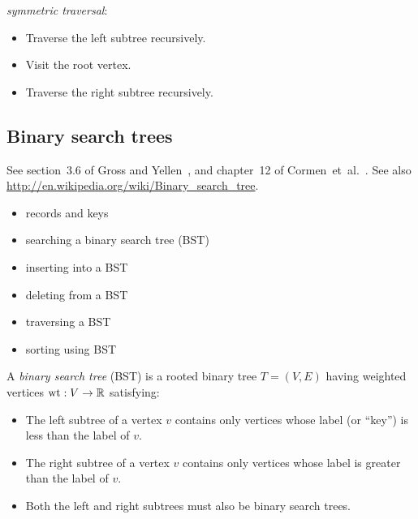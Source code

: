 \noindent
{\it symmetric traversal}:
\begin{itemize}
\item
Traverse the left subtree recursively.

\item
Visit the root vertex.

\item
Traverse the right subtree recursively.

\end{itemize}



\subsection{Binary search trees}

See section~3.6 of Gross and Yellen~\cite{GrossYellen1999}, and
chapter~12 of Cormen~et~al.~\cite{CormenEtAl2001}. See also
\url{http://en.wikipedia.org/wiki/Binary_search_tree}.


\begin{itemize}
\item records and keys

\item searching a binary search tree (BST)

\item inserting into a BST

\item deleting from a BST

\item traversing a BST

\item sorting using BST
\end{itemize}

A {\it binary search tree} (BST) is a rooted binary tree
$T=(V,E)$ having weighted vertices ${\rm wt}:V\to {\mathbb{R}}$ satisfying:

\begin{itemize}
\item
 The left subtree of a vertex $v$ contains only vertices whose label
(or ``key'') is less than the label of $v$.
\item
The right subtree of a vertex $v$ contains only vertices whose label
  is greater than the label of $v$.
\item
Both the left and right subtrees must also be binary search trees.
\end{itemize}

